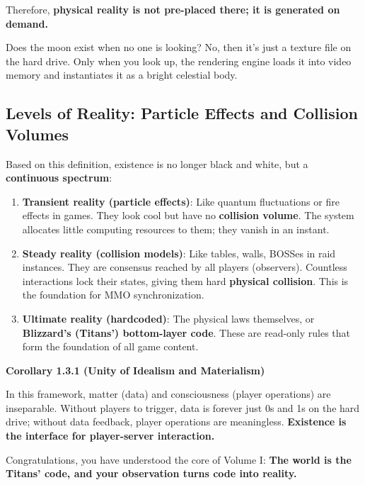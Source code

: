 Therefore, \textbf{physical reality is not pre-placed there; it is generated on demand.}

Does the moon exist when no one is looking? No, then it's just a texture file on the hard drive. Only when you look up, the rendering engine loads it into video memory and instantiates it as a bright celestial body.

\subsection{Levels of Reality: Particle Effects and Collision Volumes}

Based on this definition, existence is no longer black and white, but a \textbf{continuous spectrum}:

\begin{enumerate}
\item \textbf{Transient reality (particle effects)}: Like quantum fluctuations or fire effects in games. They look cool but have no \textbf{collision volume}. The system allocates little computing resources to them; they vanish in an instant.

\item \textbf{Steady reality (collision models)}: Like tables, walls, BOSSes in raid instances. They are consensus reached by all players (observers). Countless interactions lock their states, giving them hard \textbf{physical collision}. This is the foundation for MMO synchronization.

\item \textbf{Ultimate reality (hardcoded)}: The physical laws themselves, or \textbf{Blizzard's (Titans') bottom-layer code}. These are read-only rules that form the foundation of all game content.
\end{enumerate}

\textbf{Corollary 1.3.1 (Unity of Idealism and Materialism)}

In this framework, matter (data) and consciousness (player operations) are inseparable. Without players to trigger, data is forever just 0s and 1s on the hard drive; without data feedback, player operations are meaningless. \textbf{Existence is the interface for player-server interaction.}

Congratulations, you have understood the core of Volume I: \textbf{The world is the Titans' code, and your observation turns code into reality.}
